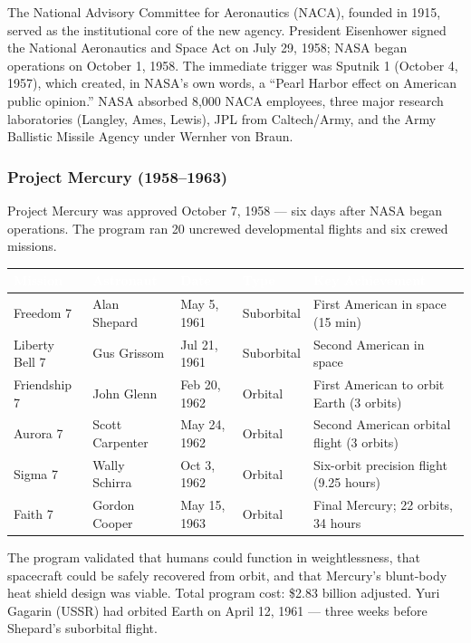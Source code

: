 \documentclass[11pt,letterpaper]{article}
\newcommand{\tableheader}[1]{\textbf{\sffamily\textcolor{white}{#1}}}
\begin{document}
The National Advisory Committee for Aeronautics (NACA), founded in 1915, served as the institutional core of the new agency. President Eisenhower signed the National Aeronautics and Space Act on July 29, 1958; NASA began operations on October 1, 1958. The immediate trigger was Sputnik 1 (October 4, 1957), which created, in NASA's own words, a ``Pearl Harbor effect on American public opinion.'' NASA absorbed 8,000 NACA employees, three major research laboratories (Langley, Ames, Lewis), JPL from Caltech/Army, and the Army Ballistic Missile Agency under Wernher von Braun.

\subsubsection{Project Mercury (1958--1963)}

Project Mercury was approved October 7, 1958 --- six days after NASA began operations. The program ran 20 uncrewed developmental flights and six crewed missions.

\begin{center}
\begin{tabularx}{\textwidth}{L{2.2cm}L{2.2cm}L{1.8cm}L{2cm}X}
\toprule
{}
\tableheader{Mission} & \tableheader{Astronaut} & \tableheader{Date} & \tableheader{Type} & \tableheader{Key Achievement} \\
\midrule
Freedom 7 & Alan Shepard & May 5, 1961 & Suborbital & First American in space (15 min) \\
Liberty Bell 7 & Gus Grissom & Jul 21, 1961 & Suborbital & Second American in space \\
Friendship 7 & John Glenn & Feb 20, 1962 & Orbital & First American to orbit Earth (3 orbits) \\
Aurora 7 & Scott Carpenter & May 24, 1962 & Orbital & Second American orbital flight (3 orbits) \\
Sigma 7 & Wally Schirra & Oct 3, 1962 & Orbital & Six-orbit precision flight (9.25 hours) \\
Faith 7 & Gordon Cooper & May 15, 1963 & Orbital & Final Mercury; 22 orbits, 34 hours \\
\bottomrule
\end{tabularx}
\end{center}

The program validated that humans could function in weightlessness, that spacecraft could be safely recovered from orbit, and that Mercury's blunt-body heat shield design was viable. Total program cost: \$2.83 billion adjusted. Yuri Gagarin (USSR) had orbited Earth on April 12, 1961 --- three weeks before Shepard's suborbital flight.
\end{document}

